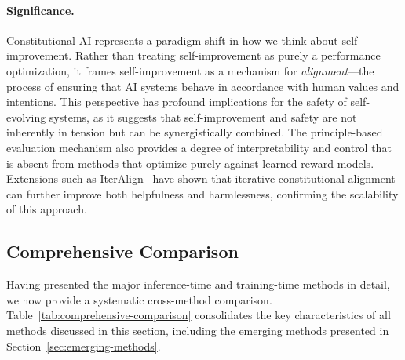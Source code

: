 \paragraph{Significance.}
Constitutional AI represents a paradigm shift in how we think about self-improvement. Rather than treating self-improvement as purely a performance optimization, it frames self-improvement as a mechanism for \emph{alignment}---the process of ensuring that AI systems behave in accordance with human values and intentions. This perspective has profound implications for the safety of self-evolving systems, as it suggests that self-improvement and safety are not inherently in tension but can be synergistically combined. The principle-based evaluation mechanism also provides a degree of interpretability and control that is absent from methods that optimize purely against learned reward models. Extensions such as IterAlign~\citep{chen2024iteraligniterativeconstitutional} have shown that iterative constitutional alignment can further improve both helpfulness and harmlessness, confirming the scalability of this approach.


\subsection{Comprehensive Comparison}
\label{sec:methods-comparison}

Having presented the major inference-time and training-time methods in detail, we now provide a systematic cross-method comparison. Table~\ref{tab:comprehensive-comparison} consolidates the key characteristics of all methods discussed in this section, including the emerging methods presented in Section~\ref{sec:emerging-methods}.

